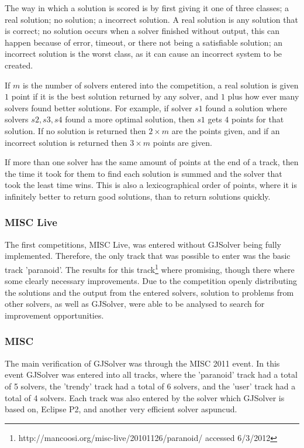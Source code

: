 The way in which a solution is scored is by first giving it one of three classes; a real solution; no solution; a incorrect solution.
A real solution is any solution that is correct; no solution occurs when a solver finished without output, this can happen because of error, timeout, or there not being a satisfiable solution;
an incorrect solution is the worst class, as it can cause an incorrect system to be created.

If $m$ is the number of solvers entered into the competition,
a real solution is given $1$ point if it is the best solution returned by any solver, and $1$ plus how ever many solvers found better solutions.
For example, if solver $s1$ found a solution where solvers $s2,s3,s4$ found a more optimal solution, then $s1$ gets $4$ points for that solution.
If no solution is returned then $2\times m$ are the points given, and if an incorrect solution is returned then $3 \times m$ points are given.

If more than one solver has the same amount of points at the end of a track, then the time it took for them to find each solution is summed and the solver that took the least time wins.
This is also a lexicographical order of points, where it is infinitely better to return good solutions, than to return solutions quickly.

\subsubsection{MISC Live}
The first competitions, MISC Live, was entered without GJSolver being fully implemented.
Therefore, the only track that was possible to enter was the basic track 'paranoid'.
The results for this track\footnote{http://mancoosi.org/misc-live/20101126/paranoid/ accessed 6/3/2012} where promising, though there where some clearly necessary improvements.
Due to the competition openly distributing the solutions and the output from the entered solvers, solution to problems from other solvers, 
as well as GJSolver, were able to be analysed to search for improvement opportunities.

\subsubsection{MISC}
The main verification of GJSolver was through the MISC 2011 event.
In this event GJSolver was entered into all tracks, where the 'paranoid' track had a total of 5 solvers, the 'trendy' track had a total of 6 solvers, 
and the 'user' track had a total of 4 solvers.
Each track was also entered by the solver which GJSolver is based on, Eclipse P2, and another very efficient solver aspuncud.

